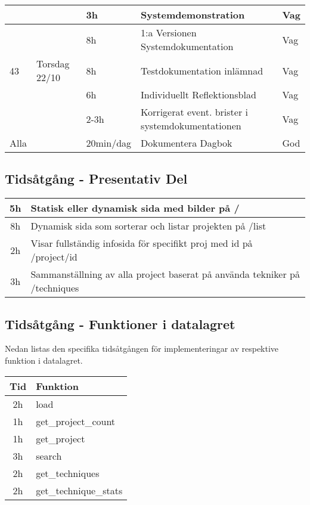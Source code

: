 \documentclass{TDP003mall}
\begin{document}
\begin{tabularx}{\linewidth}{|l|l|l|X|l|}
	\hline
          &                & 3h             & Systemdemonstration                                 & Vag         \\
	\hline
          &                & 8h             & 1:a Versionen Systemdokumentation                   & Vag         \\
	\hline
	43    & Torsdag 22/10  & 8h             & Testdokumentation inlämnad                          & Vag         \\
	\hline
          &                & 6h             & Individuellt Reflektionsblad                        & Vag         \\
	\hline
          &                & 2-3h           & Korrigerat event. brister i systemdokumentationen   & Vag         \\
	\hline
	\hline
	Alla  &                & 20min/dag      & Dokumentera Dagbok                                  & God         \\
	\hline
\end{tabularx}

\subsection{Tidsåtgång - Presentativ Del}
\begin{tabularx}{\linewidth}{|c|X|}
	\hline
	5h & Statisk eller dynamisk sida med bilder på /\\
	\hline
	8h & Dynamisk sida som sorterar och listar projekten på /list\\
	\hline
	2h & Visar fullständig infosida för specifikt proj med id på /project/id\\
	\hline
	3h & Sammanställning av alla project baserat på använda tekniker på /techniques\\
	\hline
\end{tabularx}

\subsection{Tidsåtgång - Funktioner i datalagret}
Nedan listas den specifika tidsåtgången för implementeringar av respektive funktion i datalagret.

\begin{tabularx}{\linewidth}{|c|X|}
	\hline
	Tid & Funktion\\
	\hline
	2h & load\\
	\hline
	1h & get\_project\_count\\
	\hline
	1h & get\_project\\
	\hline
	3h & search\\
	\hline
	2h & get\_techniques\\
	\hline
	2h & get\_technique\_stats\\
	\hline
\end{tabularx}
\end{document}
